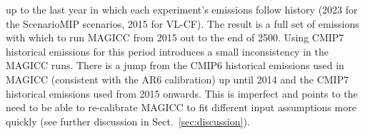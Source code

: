up to the last year in which each experiment's emissions follow history (2023 for the ScenarioMIP scenarios, 2015 for VL-CF).
The result is a full set of emissions with which to run MAGICC from 2015 out to the end of 2500.
Using CMIP7 historical emissions for this period introduces a small inconsistency in the MAGICC runs.
There is a jump from the CMIP6 historical emissions used in MAGICC (consistent with the AR6 calibration)
up until 2014 and the CMIP7 historical emissions used from 2015 onwards.
This is imperfect and points to the need to be able to re-calibrate MAGICC
to fit different input assumptions more quickly (see further discussion in Sect.~\ref{sec:discussion}).
%

